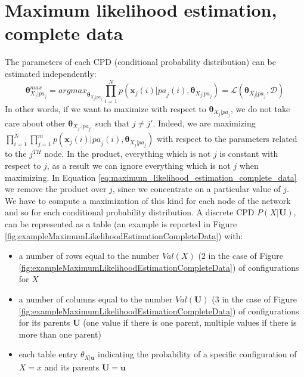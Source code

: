 \section{Maximum likelihood estimation, complete data}
The parameters of each CPD (conditional probability distribution) can be estimated independently:
\begin{equation}
    \label{eq:maximum_likelihood_estimation_complete_data}
    \pmb{\theta}^{\mathit{max}}_{X_j | \mathit{pa}_j} = \mathit{argmax}_{\pmb{\theta}_{X_j | \mathit{pa}_j}} \prod_{i=1}^N p(\pmb{x}_j(i) | \mathit{pa}_j(i), \pmb{\theta}_{X_j | \mathit{pa}_j}) = \mathcal{L}(\pmb{\theta}_{X_j|\mathit{pa}_j}, \mathcal{D})
\end{equation}
In other words, if we want to maximize with respect to $\pmb{\theta}_{X_j | \mathit{pa}_j}$, we do not take care about other $\pmb{\theta}_{X_{j'} | \mathit{pa}_{j'}}$ such that $j \neq j'$. Indeed, we are maximizing $\prod_{i=1}^N \prod_{j=1}^m p(\pmb{x}_j(i) | \mathit{pa}_j(i), \pmb{\theta}_{X_j | \mathit{pa}_j})$ with respect to the parameters related to the $j^{\mathit{TH}}$ node. In the product, everything which is not $j$ is constant with respect to $j$, as a result we can ignore everything which is not $j$ when maximizing. In Equation \ref{eq:maximum_likelihood_estimation_complete_data} we remove the product over $j$, since we concentrate on a particular value of $j$.\\
We have to compute a maximization of this kind for each node of the network and so for each conditional probability distribution. A discrete CPD $P(X|\pmb{U})$, can be represented as a table (an example is reported in Figure \ref{fig:exampleMaximumLikelihoodEstimationCompleteData}) with:
\begin{itemize}
    \item a number of rows equal to the number $\mathit{Val}(X)$ (2 in the case of Figure \ref{fig:exampleMaximumLikelihoodEstimationCompleteData}) of configurations for $X$
    \item a number of columns equal to the number $\mathit{Val}(\pmb{U})$ (3 in the case of Figure \ref{fig:exampleMaximumLikelihoodEstimationCompleteData}) of configurations for its parents $\pmb{U}$ (one value if there is one parent, multiple values if there is more than one parent)
    \item each table entry $\theta_{X|\pmb{u}}$ indicating the probability of a specific configuration of $X=x$ and its parents $\pmb{U}=\pmb{u}$
\end{itemize}

